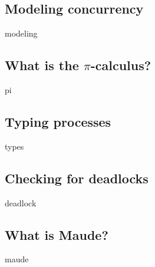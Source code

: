 \subsection{Modeling concurrency}
{modeling}

\subsection{What is the \texorpdfstring{$\pi$}{pi}-calculus?}
{pi}


\subsection{Typing processes}
{types}

\subsection{Checking for deadlocks}
{deadlock}

\subsection{What is Maude?}
\label{whatismaude}
{maude}